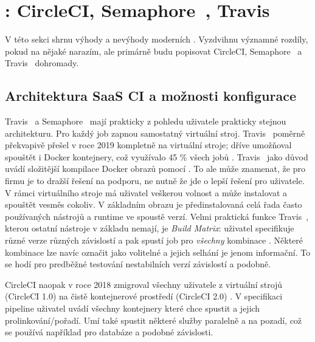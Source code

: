 \newcommand{\circleci}{\xspace{}CircleCI\xspace}
\newcommand{\travis}{\xspace{}Travis~\glstext{CI}\xspace}
\newcommand{\semaphore}{\xspace{}Semaphore~\xspace}

\section{: \circleci, \semaphore, \travis}
    V této sekci shrnu výhody a nevýhody moderních  \CI. Vyzdvihnu významné rozdíly, pokud na nějaké narazím, ale primárně budu popisovat \circleci, \semaphore a \travis dohromady.

    \subsection{Architektura SaaS CI a možnosti konfigurace}
        \travis a \semaphore mají prakticky z pohledu uživatele prakticky stejnou architekturu. Pro každý job zapnou samostatný virtuální stroj. \travis poměrně překvapivě přešel v roce 2019 kompletně na virtuální stroje; dříve umožňoval spouštět i Docker kontejnery, což využívalo 45 \% všech jobů \cite{travis-arch}. \travis jako důvod uvádí složitější kompilace Docker obrazů pomocí . To ale může znamenat, že pro firmu je to dražší řešení na podporu, ne nutně že jde o lepší řešení pro uživatele. V rámci virtuálního stroje má uživatel veškerou volnost a může instalovat a spouštět vesměs cokoliv. V základním obrazu je předinstalovaná celá řada často používaných nástrojů a runtime ve spoustě verzí. Velmi praktická funkce \travis, kterou ostatní \CI nástroje v základu nemají, je \textit{Build Matrix}: uživatel specifikuje různé verze různých závislostí a \CI pak spustí job pro \textit{všechny} kombinace \cite{travis-build-matrix}. Některé kombinace lze navíc označit jako volitelné a jejich selhání je jenom informační. To se hodí pro predběžné testování nestabilních  verzí závislostí a podobně.

        \circleci naopak v roce 2018 zmigroval všechny uživatele z virtuální strojů (\circleci 1.0) na čistě kontejnerové prostředí (\circleci 2.0) \cite{circle-migration}. V specifikaci pipeline uživatel uvádí všechny kontejnery které chce spustit a jejich prolinkování/pořadí. Umí také spustit některé služby paralelně a na pozadí, což se používá například pro databáze a podobné závislosti.


